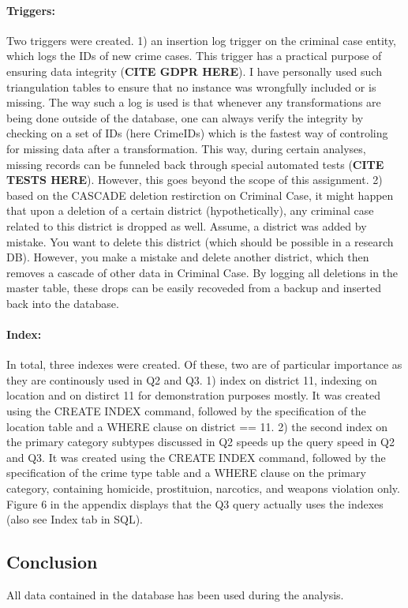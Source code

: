 \documentclass[a4paper]{article}
\begin{document}
\paragraph{Triggers:} Two triggers were created. 1) an insertion log trigger on the criminal case entity, which logs the IDs of new crime cases. This trigger has a practical purpose of ensuring data integrity (\textbf{CITE GDPR HERE}). I have personally used such triangulation tables to ensure that no instance was wrongfully included or is missing. The way such a log is used is that whenever any transformations are being done outside of the database, one can always verify the integrity by checking on a set of IDs (here CrimeIDs) which is the fastest way of controling for missing data after a transformation. This way, during certain analyses, missing records can be funneled back through special automated tests (\textbf{CITE TESTS HERE}). However, this goes beyond the scope of this assignment.
2) based on the CASCADE deletion restirction on Criminal Case, it might happen that upon a deletion of a certain district (hypothetically), any criminal case related to this district is dropped as well. Assume, a district was added by mistake. You want to delete this district (which should be possible in a research DB). However, you make a mistake and delete another district, which then removes a cascade of other data in Criminal Case. By logging all deletions in the master table, these drops can be easily recoveded from a backup and inserted back into the database.
\paragraph{Index:} In total, three indexes were created. Of these, two are of particular importance as they are continously used in Q2 and Q3. 1) index on district 11, indexing on location and on distirct 11 for demonstration purposes mostly. It was created using the CREATE INDEX command, followed by the specification of the location table and a WHERE clause on district == 11. 2) the second index on the primary category subtypes discussed in Q2 speeds up the query speed in Q2 and Q3. It was created using the CREATE INDEX command, followed by the specification of the crime type table and a WHERE clause on the primary category, containing homicide, prostituion, narcotics, and weapons violation only. Figure 6 in the appendix displays that the Q3 query actually uses the indexes (also see Index tab in SQL).  


\subsection{Conclusion}
All data contained in the database has been used during the analysis. 
\end{document}
